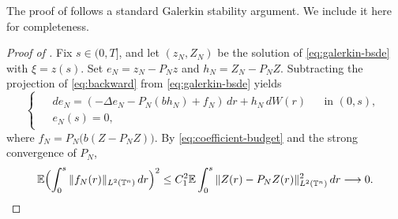 \documentclass[print,wide]{draft}
\begin{document}
The proof of  follows a standard
Galerkin stability argument.  We include it here for completeness.

\begin{proof}[Proof of ]
Fix \(s\in(0,T]\), and let \((z_N,Z_N)\) be the solution of \eqref{eq:galerkin-bsde} with \(\xi=z(s)\).
Set \(e_N=z_N-P_Nz\) and \(h_N=Z_N-P_NZ\). Subtracting the projection of \eqref{eq:backward} from \eqref{eq:galerkin-bsde} yields
\begin{equation*}
\begin{cases}
	\begin{aligned}
		&d e_N
		=(-\Delta e_N-P_N(bh_N)+f_N)\,dr+h_N\,dW(r)
		&&\text{in }(0,s),\\
		&e_N(s)=0,
	\end{aligned}
\end{cases}
\end{equation*}
where \(f_N=P_N\bigl(b(Z-P_NZ)\bigr)\).
By \eqref{eq:coefficient-budget} and the strong convergence of \(P_N\),
\begin{align}\label{eq:galerkin-residual}
\mathbb{E}\Bigl(\int_0^s\|f_N(r)\|_{L^2(\mathbb{T}^n)}\,dr\Bigr)^2
\leq C_1^2\mathbb{E}\int_0^s\|Z(r)-P_NZ(r)\|_{L^2(\mathbb{T}^n)}^2\,dr
\longrightarrow0.
\end{align}


\end{proof}
\end{document}
